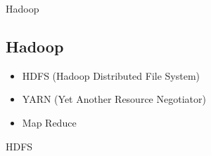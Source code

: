 \documentclass[11pt]{beamer}
\begin{document}
\begin{frame}{Hadoop}
\subsection{Hadoop}
\begin{center}
\begin{figure}
\end{figure}
\end{center}
\begin{itemize}
	\item HDFS (Hadoop Distributed File System)
	\item YARN (Yet Another Resource Negotiator)
	\item Map Reduce
\end{itemize}
\end{frame}

\begin{frame}{HDFS}
\begin{center}
\begin{figure}
\end{figure}
\end{center}
\end{frame}
\end{document}
